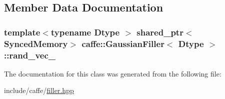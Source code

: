 \subsection{Member Data Documentation}
\hypertarget{classcaffe_1_1_gaussian_filler_afec462a3671a2ad0cc09b6149be0b63c}{
\subsubsection[{rand\+\_\+vec\+\_\+}]{\setlength{\rightskip}{0pt plus 5cm}template$<$typename Dtype $>$ shared\+\_\+ptr$<${\bf Synced\+Memory}$>$ {\bf caffe\+::\+Gaussian\+Filler}$<$ Dtype $>$\+::rand\+\_\+vec\+\_\+\hspace{0.3cm}{\ttfamily [protected]}}}\label{classcaffe_1_1_gaussian_filler_afec462a3671a2ad0cc09b6149be0b63c}


The documentation for this class was generated from the following file\+:\begin{DoxyCompactItemize}
\item 
include/caffe/\hyperlink{filler_8hpp}{filler.\+hpp}\end{DoxyCompactItemize}
